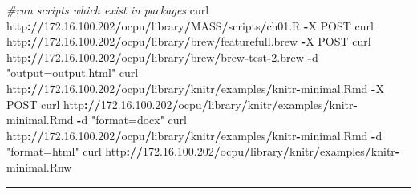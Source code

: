 \documentclass[]{book}
\newenvironment{Shaded}{\begin{snugshade}}{\end{snugshade}}
\newcommand{\FloatTok}[1]{\textcolor[rgb]{0.00,0.00,0.81}{#1}}
\newcommand{\StringTok}[1]{\textcolor[rgb]{0.31,0.60,0.02}{#1}}
\newcommand{\CommentTok}[1]{\textcolor[rgb]{0.56,0.35,0.01}{\textit{#1}}}
\newcommand{\OperatorTok}[1]{\textcolor[rgb]{0.81,0.36,0.00}{\textbf{#1}}}
\newcommand{\ErrorTok}[1]{\textcolor[rgb]{0.64,0.00,0.00}{\textbf{#1}}}
\newcommand{\NormalTok}[1]{#1}
\begin{document}
\begin{Shaded}
\begin{Highlighting}[]
\CommentTok{#run scripts which exist in packages}
\NormalTok{curl http}\OperatorTok{:}\ErrorTok{//}\FloatTok{172.16}\NormalTok{.}\FloatTok{100.202}\OperatorTok{/}\NormalTok{ocpu}\OperatorTok{/}\NormalTok{library}\OperatorTok{/}\NormalTok{MASS}\OperatorTok{/}\NormalTok{scripts}\OperatorTok{/}\NormalTok{ch01.R }\OperatorTok{-}\NormalTok{X POST}
\NormalTok{curl http}\OperatorTok{:}\ErrorTok{//}\FloatTok{172.16}\NormalTok{.}\FloatTok{100.202}\OperatorTok{/}\NormalTok{ocpu}\OperatorTok{/}\NormalTok{library}\OperatorTok{/}\NormalTok{brew}\OperatorTok{/}\NormalTok{featurefull.brew }\OperatorTok{-}\NormalTok{X POST}
\NormalTok{curl http}\OperatorTok{:}\ErrorTok{//}\FloatTok{172.16}\NormalTok{.}\FloatTok{100.202}\OperatorTok{/}\NormalTok{ocpu}\OperatorTok{/}\NormalTok{library}\OperatorTok{/}\NormalTok{brew}\OperatorTok{/}\NormalTok{brew}\OperatorTok{-}\NormalTok{test}\OperatorTok{-}\FloatTok{2.}\NormalTok{brew }\OperatorTok{-}\NormalTok{d }\StringTok{"output=output.html"}
\NormalTok{curl http}\OperatorTok{:}\ErrorTok{//}\FloatTok{172.16}\NormalTok{.}\FloatTok{100.202}\OperatorTok{/}\NormalTok{ocpu}\OperatorTok{/}\NormalTok{library}\OperatorTok{/}\NormalTok{knitr}\OperatorTok{/}\NormalTok{examples}\OperatorTok{/}\NormalTok{knitr}\OperatorTok{-}\NormalTok{minimal.Rmd }\OperatorTok{-}\NormalTok{X POST}
\NormalTok{curl http}\OperatorTok{:}\ErrorTok{//}\FloatTok{172.16}\NormalTok{.}\FloatTok{100.202}\OperatorTok{/}\NormalTok{ocpu}\OperatorTok{/}\NormalTok{library}\OperatorTok{/}\NormalTok{knitr}\OperatorTok{/}\NormalTok{examples}\OperatorTok{/}\NormalTok{knitr}\OperatorTok{-}\NormalTok{minimal.Rmd }\OperatorTok{-}\NormalTok{d }\StringTok{"format=docx"}
\NormalTok{curl http}\OperatorTok{:}\ErrorTok{//}\FloatTok{172.16}\NormalTok{.}\FloatTok{100.202}\OperatorTok{/}\NormalTok{ocpu}\OperatorTok{/}\NormalTok{library}\OperatorTok{/}\NormalTok{knitr}\OperatorTok{/}\NormalTok{examples}\OperatorTok{/}\NormalTok{knitr}\OperatorTok{-}\NormalTok{minimal.Rmd }\OperatorTok{-}\NormalTok{d }\StringTok{"format=html"}
\NormalTok{curl http}\OperatorTok{:}\ErrorTok{//}\FloatTok{172.16}\NormalTok{.}\FloatTok{100.202}\OperatorTok{/}\NormalTok{ocpu}\OperatorTok{/}\NormalTok{library}\OperatorTok{/}\NormalTok{knitr}\OperatorTok{/}\NormalTok{examples}\OperatorTok{/}\NormalTok{knitr}\OperatorTok{-}\NormalTok{minimal.Rnw}
\end{Highlighting}
\end{Shaded}

\begin{center}\rule{0.5\linewidth}{\linethickness}\end{center}
\end{document}
